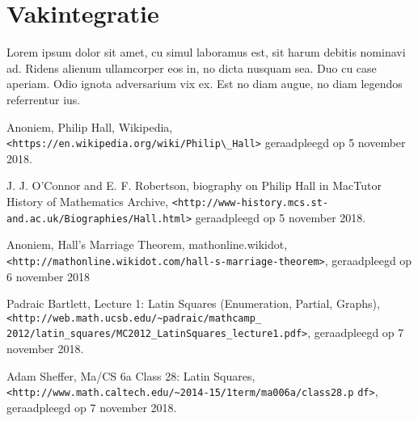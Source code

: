 \documentclass[a4paper,11pt]{article}
\begin{document}
	
	\section{Vakintegratie}	%
	
		Lorem ipsum dolor sit amet, cu simul laboramus est, sit harum debitis nominavi ad. Ridens alienum ullamcorper eos in, no dicta nusquam sea. Duo cu case aperiam. Odio ignota adversarium vix ex. Est no diam augue, no diam legendos referrentur ius.
	 
	
	
	
	
	\begin{thebibliography}{10}	%
		 Anoniem, Philip Hall, Wikipedia, 	\verb|<https://en.wikipedia.org/wiki/P|\newline\verb|hilip\_Hall>| geraadpleegd op 5 november 2018.
		
		 J. J. O'Connor and E. F. Robertson, biography on Philip Hall in MacTutor History of Mathematics Archive, \verb|<http://www-history.mcs.st-and.ac.uk/Biographies/Hall.html>| geraadpleegd op 5 november 2018. 
		
		 Anoniem, Hall's Marriage Theorem, mathonline.wikidot, \verb|<http://mathonline.wikidot.com/hall-s-marriage-theorem>|, geraadpleegd op 6 november 2018
		
		 Padraic Bartlett, Lecture 1: Latin Squares (Enumeration, Partial, Graphs), \verb|<http://web.math.ucsb.edu/~padraic/mathcamp_| \verb|2012/latin_squares/MC2012_LatinSquares_lecture1.pdf>|, geraadpleegd op 7 november 2018.
		
		 Adam Sheffer, Ma/CS 6a
		Class 28: Latin Squares, \verb|<http://www.math.caltech.edu/~2014-15/1term/ma006a/class28.p| \verb|df>|, geraadpleegd op 7 november 2018.
	\end{thebibliography}
	\listoffigures		%
	\listoftables		%
\end{document}
